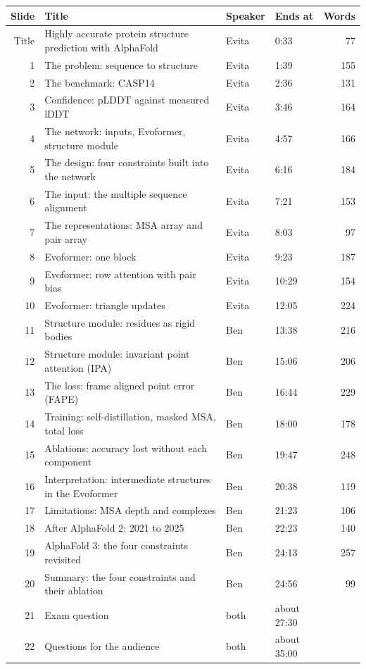 \documentclass[10pt,a4paper]{article}
\begin{document}
\begin{center}
\small
\setlength{\tabcolsep}{4pt}
\begin{tabular}{@{}rlllr@{}}
\toprule
Slide & Title & Speaker & Ends at & Words \\
\midrule
Title & Highly accurate protein structure prediction with AlphaFold & Evita & 0:33 & 77 \\
1 & The problem: sequence to structure & Evita & 1:39 & 155 \\
2 & The benchmark: CASP14 & Evita & 2:36 & 131 \\
3 & Confidence: pLDDT against measured lDDT & Evita & 3:46 & 164 \\
4 & The network: inputs, Evoformer, structure module & Evita & 4:57 & 166 \\
5 & The design: four constraints built into the network & Evita & 6:16 & 184 \\
6 & The input: the multiple sequence alignment & Evita & 7:21 & 153 \\
7 & The representations: MSA array and pair array & Evita & 8:03 & 97 \\
8 & Evoformer: one block & Evita & 9:23 & 187 \\
9 & Evoformer: row attention with pair bias & Evita & 10:29 & 154 \\
10 & Evoformer: triangle updates & Evita & 12:05 & 224 \\
\midrule
11 & Structure module: residues as rigid bodies & Ben & 13:38 & 216 \\
12 & Structure module: invariant point attention (IPA) & Ben & 15:06 & 206 \\
13 & The loss: frame aligned point error (FAPE) & Ben & 16:44 & 229 \\
14 & Training: self-distillation, masked MSA, total loss & Ben & 18:00 & 178 \\
15 & Ablations: accuracy lost without each component & Ben & 19:47 & 248 \\
16 & Interpretation: intermediate structures in the Evoformer & Ben & 20:38 & 119 \\
17 & Limitations: MSA depth and complexes & Ben & 21:23 & 106 \\
18 & After AlphaFold 2: 2021 to 2025 & Ben & 22:23 & 140 \\
19 & AlphaFold 3: the four constraints revisited & Ben & 24:13 & 257 \\
20 & Summary: the four constraints and their ablation & Ben & 24:56 & 99 \\
\midrule
21 & Exam question & both & about 27:30 & \\
22 & Questions for the audience & both & about 35:00 & \\
\bottomrule
\end{tabular}
\end{center}
\end{document}
